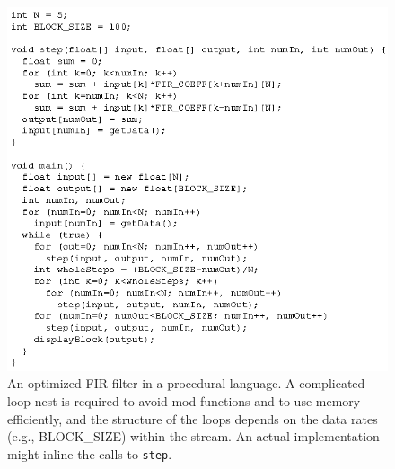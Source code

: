 \begin{figure}
\centering
\includegraphics{fir-proc.eps}
\caption{An optimized FIR filter in a procedural language.  A
  complicated loop nest is required to avoid mod functions and to use
  memory efficiently, and the structure of the loops depends on the
  data rates (e.g., BLOCK\_SIZE) within the stream.  An actual
  implementation might inline the calls to \texttt{step}.}
\label{fig:firprocedural}
\end{figure}

